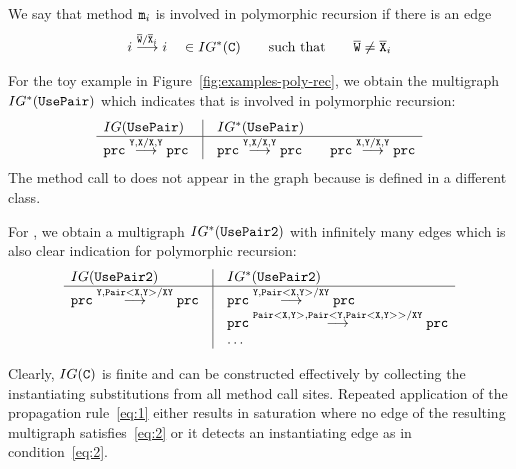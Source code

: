 \begin{definition}
  We say that method ${\tt m}_i$ is involved in polymorphic recursion
  if there is an edge
  \begin{gather}\label{eq:2}
    i \stackrel{\overline{\tt W}/\overline{\tt X}_i}{\longrightarrow} i \quad \in IG^*
    ({\tt C}) \qquad \text{such that} \qquad \overline{\tt W} \ne \overline{\tt X}_i
  \end{gather}
\end{definition}
For the toy example in Figure~\ref{fig:examples-poly-rec}, we obtain
the multigraph $IG^* ({\tt UsePair})$ which indicates that  is
involved in polymorphic recursion:
\begin{gather*}
  \begin{array}{l@{\quad}|@{\quad}l}
    IG(\mv{UsePair})& IG^* (\mv{UsePair}) \\\hline
    \mv{prc} \stackrel{\mv{Y,X}/\mv{X,Y}}{\longrightarrow} \mv{prc} &
    \mv{prc} \stackrel{\mv{Y,X}/\mv{X,Y}}{\longrightarrow} \mv{prc} \qquad
    \mv{prc} \stackrel{\mv{X,Y}/\mv{X,Y}}{\longrightarrow} \mv{prc}
  \end{array}
\end{gather*}
The method call to  does not appear in the graph because
 is defined in a different class.

For , we obtain a multigraph $IG^* ({\tt UsePair2})$ with
infinitely many edges which is also clear indication for polymorphic recursion:
\begin{gather*}
  \begin{array}{l@{\quad}|@{\quad}l}
    IG(\mv{UsePair2})& IG^* (\mv{UsePair2}) \\\hline
    \mv{prc} \stackrel{\mv{Y,Pair<X,Y>}/\mv{XY}}{\longrightarrow} \mv{prc}
    &
    \mv{prc} \stackrel{\mv{Y,Pair<X,Y>}/\mv{XY}}{\longrightarrow}
      \mv{prc} \\
    &
      \mv{prc}
      \stackrel{\mv{Pair<X,Y>,Pair<Y,Pair<X,Y>>}/\mv{XY}}{\longrightarrow}
      \mv{prc}
      \\
                     & \dots
  \end{array}
\end{gather*}


Clearly, $IG ({\tt C})$ is finite and can be constructed effectively by
collecting the instantiating substitutions from all method call
sites.
Repeated application of the propagation rule~\eqref{eq:1} either
results in saturation where no edge of the resulting multigraph satisfies~\eqref{eq:2} or it
detects an instantiating edge as in condition~\eqref{eq:2}. 

